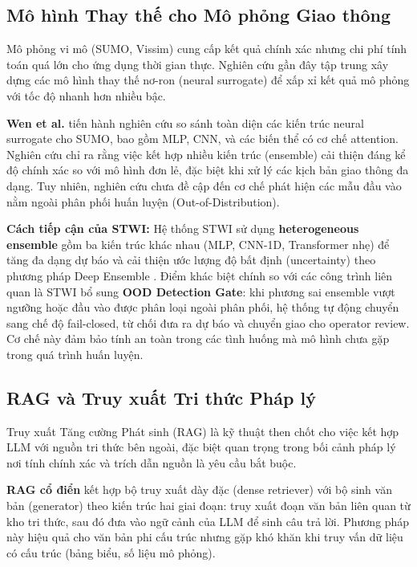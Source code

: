 \subsection{Mô hình Thay thế cho Mô phỏng Giao thông}

Mô phỏng vi mô (SUMO, Vissim) cung cấp kết quả chính xác nhưng chi phí tính toán quá lớn cho ứng dụng thời gian thực. Nghiên cứu gần đây tập trung xây dựng các mô hình thay thế nơ-ron (neural surrogate) để xấp xỉ kết quả mô phỏng với tốc độ nhanh hơn nhiều bậc.

\textbf{Wen et al.} \cite{wen2023surrogate} tiến hành nghiên cứu so sánh toàn diện các kiến trúc neural surrogate cho SUMO, bao gồm MLP, CNN, và các biến thể có cơ chế attention. Nghiên cứu chỉ ra rằng việc kết hợp nhiều kiến trúc (ensemble) cải thiện đáng kể độ chính xác so với mô hình đơn lẻ, đặc biệt khi xử lý các kịch bản giao thông đa dạng. Tuy nhiên, nghiên cứu chưa đề cập đến cơ chế phát hiện các mẫu đầu vào nằm ngoài phân phối huấn luyện (Out-of-Distribution).

\textbf{Cách tiếp cận của STWI:} Hệ thống STWI sử dụng \textbf{heterogeneous ensemble} gồm ba kiến trúc khác nhau (MLP, CNN-1D, Transformer nhẹ) để tăng đa dạng dự báo và cải thiện ước lượng độ bất định (uncertainty) theo phương pháp Deep Ensemble \cite{lakshminarayanan2017ade}. Điểm khác biệt chính so với các công trình liên quan là STWI bổ sung \textbf{OOD Detection Gate}: khi phương sai ensemble vượt ngưỡng hoặc đầu vào được phân loại ngoài phân phối, hệ thống tự động chuyển sang chế độ fail-closed, từ chối đưa ra dự báo và chuyển giao cho operator review. Cơ chế này đảm bảo tính an toàn trong các tình huống mà mô hình chưa gặp trong quá trình huấn luyện.

\subsection{RAG và Truy xuất Tri thức Pháp lý}

Truy xuất Tăng cường Phát sinh (RAG) là kỹ thuật then chốt cho việc kết hợp LLM với nguồn tri thức bên ngoài, đặc biệt quan trọng trong bối cảnh pháp lý nơi tính chính xác và trích dẫn nguồn là yêu cầu bắt buộc.

\textbf{RAG cổ điển} \cite{lewis2020rag} kết hợp bộ truy xuất dày đặc (dense retriever) với bộ sinh văn bản (generator) theo kiến trúc hai giai đoạn: truy xuất đoạn văn bản liên quan từ kho tri thức, sau đó đưa vào ngữ cảnh của LLM để sinh câu trả lời. Phương pháp này hiệu quả cho văn bản phi cấu trúc nhưng gặp khó khăn khi truy vấn dữ liệu có cấu trúc (bảng biểu, số liệu mô phỏng).

